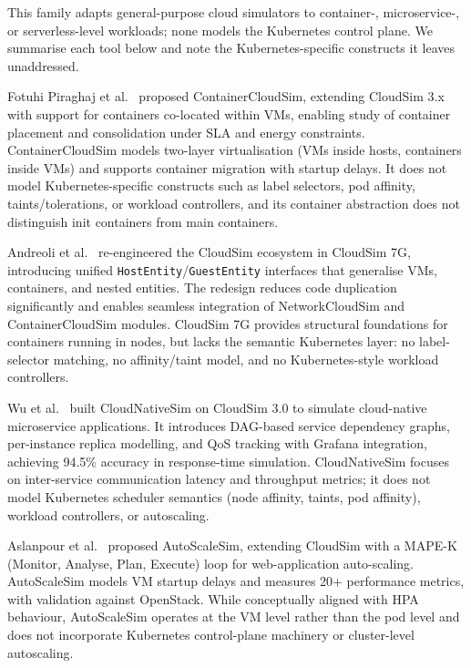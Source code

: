 \documentclass[ASNA,twocolumn]{USG}
\begin{document}
    This family adapts general-purpose cloud simulators to container-,
    microservice-, or serverless-level workloads; none models the
    Kubernetes control plane. We summarise each tool below and note the
    Kubernetes-specific constructs it leaves unaddressed.

    Fotuhi Piraghaj et al.~\cite{Piraghaj2017} proposed ContainerCloudSim,
    extending CloudSim 3.x with support for containers co-located within
    VMs, enabling study of container placement and consolidation under SLA
    and energy constraints. ContainerCloudSim models two-layer
    virtualisation (VMs inside hosts, containers inside VMs) and supports
    container migration with startup delays. It does not model
    Kubernetes-specific constructs such as label selectors, pod affinity,
    taints/tolerations, or workload controllers, and its container
    abstraction does not distinguish init containers from main containers.

    Andreoli et al.~\cite{Andreoli2025} re-engineered the CloudSim
    ecosystem in CloudSim 7G, introducing unified
    \texttt{HostEntity}/\texttt{GuestEntity} interfaces that generalise
    VMs, containers, and nested entities. The redesign reduces code
    duplication significantly and enables seamless integration of
    NetworkCloudSim and ContainerCloudSim modules. CloudSim 7G provides
    structural foundations for containers running in nodes, but lacks the
    semantic Kubernetes layer: no label-selector matching, no
    affinity/taint model, and no Kubernetes-style workload controllers.

    Wu et al.~\cite{Wu2025} built CloudNativeSim on CloudSim 3.0 to
    simulate cloud-native microservice applications. It introduces
    DAG-based service dependency graphs, per-instance replica modelling,
    and QoS tracking with Grafana integration, achieving 94.5\% accuracy
    in response-time simulation. CloudNativeSim focuses on inter-service
    communication latency and throughput metrics; it does not model
    Kubernetes scheduler semantics (node affinity, taints, pod affinity),
    workload controllers, or autoscaling.

    Aslanpour et al.~\cite{Aslanpour2021} proposed AutoScaleSim, extending
    CloudSim with a MAPE-K (Monitor, Analyse, Plan, Execute) loop for
    web-application auto-scaling. AutoScaleSim models VM startup delays
    and measures 20+ performance metrics, with validation against
    OpenStack. While conceptually aligned with HPA behaviour, AutoScaleSim
    operates at the VM level rather than the pod level and does not
    incorporate Kubernetes control-plane machinery or cluster-level
    autoscaling.
\end{document}
